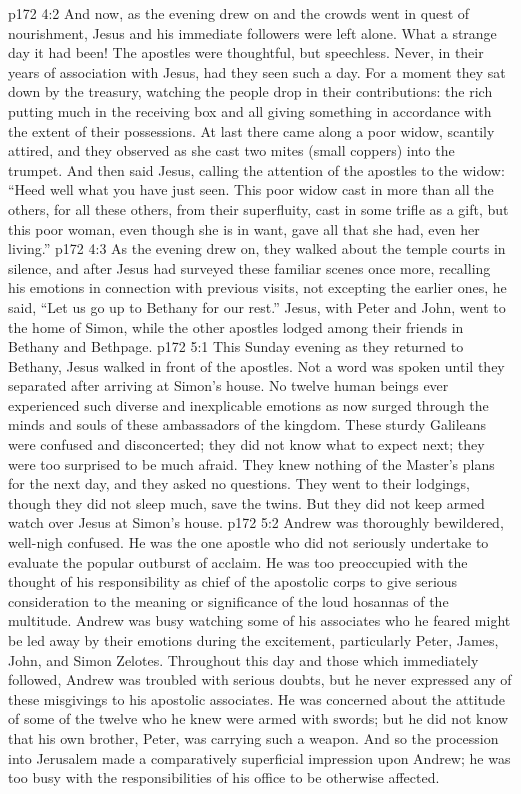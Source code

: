 \vs p172 4:2 And now, as the evening drew on and the crowds went in quest of nourishment, Jesus and his immediate followers were left alone. What a strange day it had been! The apostles were thoughtful, but speechless. Never, in their years of association with Jesus, had they seen such a day. For a moment they sat down by the treasury, watching the people drop in their contributions: the rich putting much in the receiving box and all giving something in accordance with the extent of their possessions. At last there came along a poor widow, scantily attired, and they observed as she cast two mites (small coppers) into the trumpet. And then said Jesus, calling the attention of the apostles to the widow: \textcolor{ubdarkred}{“Heed well what you have just seen. This poor widow cast in more than all the others, for all these others, from their superfluity, cast in some trifle as a gift, but this poor woman, even though she is in want, gave all that she had, even her living.”}\plusone
\vs p172 4:3 As the evening drew on, they walked about the temple courts in silence, and after Jesus had surveyed these familiar scenes once more, recalling his emotions in connection with previous visits, not excepting the earlier ones, he said, \textcolor{ubdarkred}{“Let us go up to Bethany for our rest.”} Jesus, with Peter and John, went to the home of Simon, while the other apostles lodged among their friends in Bethany and Bethpage.
\vs p172 5:1 This Sunday evening as they returned to Bethany, Jesus walked in front of the apostles. Not a word was spoken until they separated after arriving at Simon’s house. No twelve human beings ever experienced such diverse and inexplicable emotions as now surged through the minds and souls of these ambassadors of the kingdom. These sturdy Galileans were confused and disconcerted; they did not know what to expect next; they were too surprised to be much afraid. They knew nothing of the Master’s plans for the next day, and they asked no questions. They went to their lodgings, though they did not sleep much, save the twins. But they did not keep armed watch over Jesus at Simon’s house.
\vs p172 5:2 Andrew was thoroughly bewildered, well\hyp{}nigh confused. He was the one apostle who did not seriously undertake to evaluate the popular outburst of acclaim. He was too preoccupied with the thought of his responsibility as chief of the apostolic corps to give serious consideration to the meaning or significance of the loud hosannas of the multitude. Andrew was busy watching some of his associates who he feared might be led away by their emotions during the excitement, particularly Peter, James, John, and Simon Zelotes. Throughout this day and those which immediately followed, Andrew was troubled with serious doubts, but he never expressed any of these misgivings to his apostolic associates. He was concerned about the attitude of some of the twelve who he knew were armed with swords; but he did not know that his own brother, Peter, was carrying such a weapon. And so the procession into Jerusalem made a comparatively superficial impression upon Andrew; he was too busy with the responsibilities of his office to be otherwise affected.
